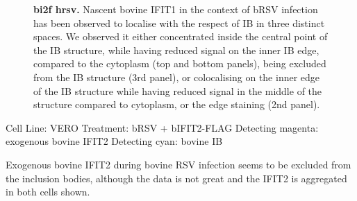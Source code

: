 \begin{figure}
\begin{subfigure}{1\textwidth}
    \end{subfigure}
    \caption[bi2f hrsv]{\textbf{bi2f hrsv.} Nascent bovine IFIT1 in the context of bRSV infection has been observed to localise with the respect of IB in three distinct spaces. We observed it either concentrated inside the central point of the IB structure, while having reduced signal on the inner IB edge, compared to the cytoplasm (top and bottom panels), being excluded from the IB structure (3rd panel), or colocalising on the inner edge of the IB structure while having reduced signal in the middle of the structure compared to cytoplasm, or the edge staining (2nd panel).}
    \label{fig:bi2f hrsv}
\end{figure}

Cell Line: VERO \newline
Treatment: bRSV + bIFIT2-FLAG \newline
Detecting magenta: exogenous bovine IFIT2 \newline
Detecting cyan: bovine IB \newline

Exogenous bovine IFIT2 during bovine RSV infection seems to be excluded from the inclusion bodies, although the data is not great and the IFIT2 is aggregated in both cells shown.

